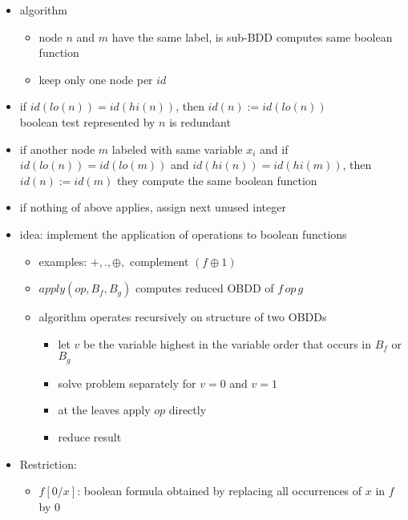 \documentclass[a4paper, 10pt]{article}
\begin{document}
\begin{mdframed}
\begin{itemize}
\begin{itemize}
    \end{itemize}
    \item algorithm
    \begin{itemize}
        \item node $n$ and $m$ have the same label, is sub-BDD computes same boolean function
        \item keep only one node per $id$
    \end{itemize}
    \begin{center}
    \scalebox{1}{}
    \end{center}
    \item if $id(lo(n)) = id(hi(n))$, then $id(n):=id(lo(n))$ \\
    boolean test represented by $n$ is redundant
    \item if another node $m$ labeled with same variable $x_i$ and if $id(lo(n))=id(lo(m))$ and $id(hi(n))=id(hi(m))$, then $id(n):=id(m)$ \follows they compute the same boolean function
    \item if nothing of above applies, assign next unused integer
\end{itemize}
\begin{itemize}
    \item idea: implement the application of operations to boolean functions
    \begin{itemize}
        \item examples: $+,.,\oplus,$ complement $(f\oplus 1)$
        \item $apply(op,B_f,B_g)$ computes reduced OBDD of $f \, op \, g$
        \item algorithm operates recursively on structure of two OBDDs
        \begin{itemize}
            \item let $v$ be the variable highest in the variable order that occurs in $B_f$ or $B_g$
            \item solve problem separately for $v=0$ and $v=1$
            \item at the leaves apply $op$ directly
            \item reduce result
        \end{itemize}
    \end{itemize}
    \item Restriction:
    \begin{itemize}
        \item $f[0/x]$: boolean formula obtained by replacing all occurrences of $x$ in $f$ by $0$

\end{itemize}
\end{itemize}
\end{mdframed}
\end{document}
